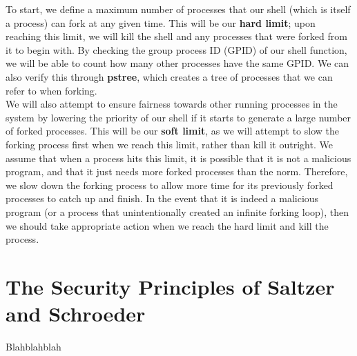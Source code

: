 \documentclass{article}
\begin{document}
To start, we define a maximum number of processes that our shell (which is 
itself a process) can fork at any given time. This will be our \textbf{hard  
limit}; upon reaching this limit, we will kill the shell and any processes that
were forked from it to begin with. By checking the group process ID (GPID) of 
our shell function, we will be able to count how many other processes have the 
same GPID. We can also verify this through \textbf{pstree}, which creates a
tree of processes that we can refer to when forking. \\
We will also attempt to ensure fairness towards other running processes in the
system by lowering the priority of our shell if it starts to generate a large
number of forked processes. This will be our \textbf{soft limit}, as we will
attempt to slow the forking process first when we reach this limit, rather 
than kill it outright. We assume that when a process hits this limit, it is
possible that it is not a malicious program, and that it just needs more forked
processes than the norm. Therefore, we slow down the forking process to allow 
more time for its previously forked processes to catch up and finish. In the
event that it is indeed a malicious program (or a process that unintentionally 
created an infinite forking loop), then we should take appropriate action when 
we reach the hard limit and kill the process. \\



\section{The Security Principles of Saltzer and Schroeder}
Blahblahblah \\
\end{document}

